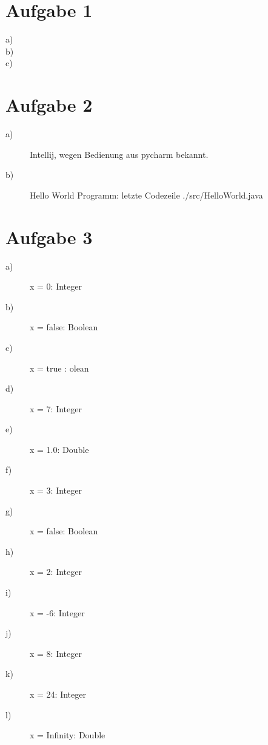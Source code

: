 
\newcommand{\dozent}{Prof. Dr. Claudia Müller-Birn, Barry Linnert}					%
\newcommand{\tutor}{Thierry Meurers}						%
\newcommand{\tutoriumNo}{10}				%
\newcommand{\ubungNo}{06}									%
\newcommand{\veranstaltung}{Objektorientierte Programmierung}	%
\newcommand{\semester}{SoSe 17}						%
\newcommand{\studenten}{Stefaan Hessmann, Jaap Pedersen, Mark Niehues}			%




\section{Aufgabe 1}
\begin{description}
\item[a)] 
\item[b)] 
\item[c)]
\end{description}

\section{Aufgabe 2}
\begin{description}
\item[a)]
Intellij, wegen Bedienung aus pycharm bekannt. 
\item[b)]
Hello World Programm:
 letzte Codezeile
{./src/HelloWorld.java}

\end{description}

\section{Aufgabe 3}
\begin{description}
\item[a)] x = 0: 	 Integer
\item[b)] x = false: 	 Boolean
\item[c)] x = true 	: 	olean
\item[d)] x = 7: 	 Integer
\item[e)] x = 1.0: 	 Double
\item[f)] x = 3: 	 Integer
\item[g)] x = false: 	 Boolean
\item[h)] x = 2: 	 Integer
\item[i)] x = -6: 	 Integer
\item[j)] x = 8: 	 Integer
\item[k)] x = 24: 	 Integer
\item[l)] x = Infinity: 	 Double
\end{description}


